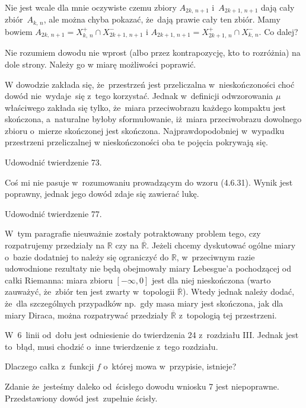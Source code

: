 \documentclass[a4paper,11pt]{article}
\begin{document}
\start {} Nie jest wcale dla mnie oczywiste czemu zbiory
$A_{ 2 k,\, n+ 1 }$ i~$A_{ 2 k + 1,\, n+ 1 }$ dają cały
zbiór~$A_{ k,\, n }$, ale można chyba pokazać, że~dają prawie cały ten
zbiór. Mamy bowiem
$A_{ 2 k,\, n + 1 } = X^{ + }_{ k,\, n } \cap X^{ - }_{ 2 k + 1,\, n +
  1 }$ i
$A_{ 2 k + 1,\, n + 1 } = X^{ + }_{ 2 k + 1,\, n } \cap X^{ - }_{ k,\,
  n }$. Co dalej?
  
\start {} Nie rozumiem dowodu nie wprost (albo przez
kontrapozycję, kto to rozróżnia) na dole strony. Należy go w miarę
możliwości poprawić.
  
\start {} W dowodzie zakłada się, że~przestrzeń jest
przeliczalna w~nieskończoności choć dowód nie~wydaje~się z~tego
korzystać. Jednak w~definicji odwzorowania $\mu$\dywiz właściwego
zakłada się tylko, że~miara przeciwobrazu każdego kompaktu jest
skończona, a~naturalne byłoby sformułowanie, iż~miara przeciwobrazu
dowolnego zbioru o~mierze skończonej jest skończona.
Najprawdopodobniej w~wypadku przestrzeni przeliczalnej w
nieskończoności oba te pojęcia pokrywają się.
  
\start {} Udowodnić twierdzenie 73.
  
\start {} Coś mi nie pasuje w~rozumowaniu prowadzącym do wzoru
(4.6.31). Wynik jest poprawny, jednak jego dowód zdaje się zawierać
lukę.
  
\start {} Udowodnić twierdzenie 77.

\start {} W~tym paragrafie nieuważnie zostały potraktowany
problem tego, czy rozpatrujemy przedziały na $\mathbb{R}$ czy na
$\overline{\mathbb{R}}$. Jeżeli chcemy dyskutować ogólne miary o~bazie
dodatniej to należy się ograniczyć do $\mathbb{R}$, w~przeciwnym razie
udowodnione rezultaty nie będą obejmowały miary Lebesgue'a pochodzącej
od całki Riemanna: miara zbioru $[-\infty, 0]$ jest dla niej
nieskończona (warto zauważyć, że~zbiór ten jest zwarty w~topologii
$\overline{\mathbb{R}}$). Wtedy jednak należy dodać, że~dla
szczególnych przypadków np.~gdy masa miary jest skończona, jak dla
miary Diraca, można rozpatrywać przedziały $\overline{\mathbb{R}}$
z~topologią tej przestrzeni.

\start {} W~6~linii od~dołu jest odniesienie do twierdzenia 24
z~rozdziału III. Jednak jest to~błąd, musi chodzić o~inne twierdzenie
z~tego rozdziału.

\start {} Dlaczego całka z~funkcji $f$ o~której mowa
w~przypisie, istnieje?

\start {} Zdanie że~jesteśmy daleko od~ścisłego dowodu wniosku
7 jest niepoprawne. Przedstawiony dowód jest~zupełnie ścisły.
  
\end{document}
